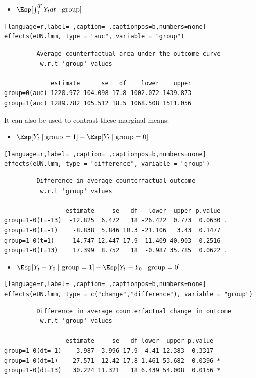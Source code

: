 \documentclass[12pt]{article}
\begin{document}
\begin{itemize}
\item \(\Esp[\int_0^T Y_t dt \mid \text{group}]\)
\end{itemize}
\begin{lstlisting}[language=r,label= ,caption= ,captionpos=b,numbers=none]
effects(eUN.lmm, type = "auc", variable = "group")
\end{lstlisting}

\begin{verbatim}
	     Average counterfactual area under the outcome curve
	      w.r.t 'group' values 

             estimate      se   df    lower    upper
group=0(auc) 1220.972 104.098 17.8 1002.072 1439.873
group=1(auc) 1289.782 105.512 18.5 1068.508 1511.056
\end{verbatim}


It can also be used to contrast these marginal means:
\begin{itemize}
\item \(\Esp[Y_t \mid \text{group}=1]-\Esp[Y_t \mid \text{group}=0]\)
\end{itemize}
\begin{lstlisting}[language=r,label= ,caption= ,captionpos=b,numbers=none]
effects(eUN.lmm, type = "difference", variable = "group")
\end{lstlisting}

\begin{verbatim}
	     Difference in average counterfactual outcome
	      w.r.t 'group' values 

                 estimate     se   df   lower  upper p.value  
group=1-0(t=-13)  -12.825  6.472   18 -26.422  0.773  0.0630 .
group=1-0(t=-1)    -8.838  5.846 18.3 -21.106   3.43  0.1477  
group=1-0(t=1)     14.747 12.447 17.9 -11.409 40.903  0.2516  
group=1-0(t=13)    17.399  8.752   18  -0.987 35.785  0.0622 .
\end{verbatim}


\begin{itemize}
\item \(\Esp[Y_t-Y_0 \mid \text{group}=1]-\Esp[Y_t-Y_0 \mid \text{group}=0]\)
\end{itemize}
\begin{lstlisting}[language=r,label= ,caption= ,captionpos=b,numbers=none]
effects(eUN.lmm, type = c("change","difference"), variable = "group")
\end{lstlisting}

\begin{verbatim}
	     Difference in average counterfactual change in outcome
	      w.r.t 'group' values 

                 estimate     se   df lower  upper p.value  
group=1-0(dt=-1)    3.987  3.996 17.9 -4.41 12.383  0.3317  
group=1-0(dt=1)    27.571  12.42 17.8 1.461 53.682  0.0396 *
group=1-0(dt=13)   30.224 11.321   18 6.439 54.008  0.0156 *
\end{verbatim}
\end{document}
